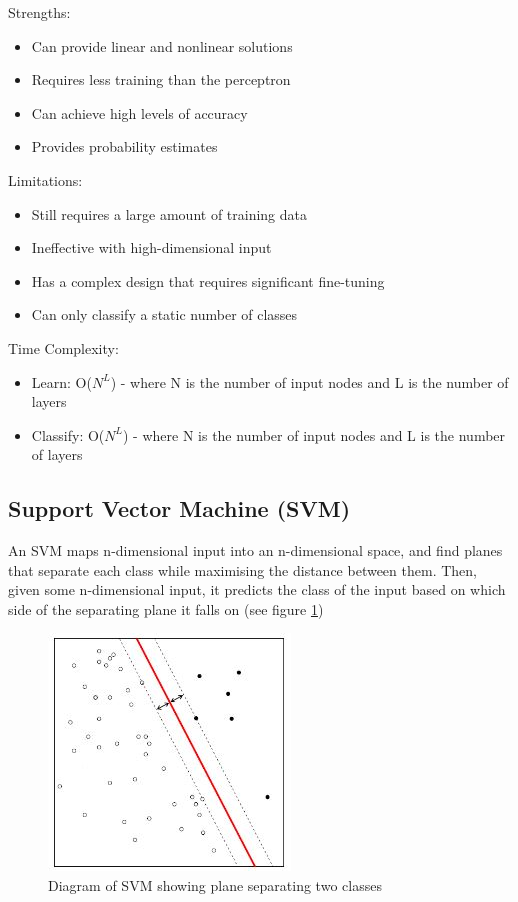 Strengths:
\begin{itemize}
    \item Can provide linear and nonlinear solutions
    \item Requires less training than the perceptron
    \item Can achieve high levels of accuracy
    \item Provides probability estimates
\end{itemize}

Limitations:
\begin{itemize}
    \item Still requires a large amount of training data
    \item Ineffective with high-dimensional input
    \item Has a complex design that requires significant fine-tuning
    \item Can only classify a static number of classes
\end{itemize}

Time Complexity:
\begin{itemize}
    \item Learn: O($N^{L}$) - where N is the number of input nodes and L is the number of layers
    \item Classify: O($N^{L}$) - where N is the number of input nodes and L is the number of layers
\end{itemize}

\subsection{Support Vector Machine (SVM)}
An SVM maps n-dimensional input into an n-dimensional space, and find planes that separate each class while maximising the distance between them. Then, given some n-dimensional input, it predicts the class of the input based on which side of the separating plane it falls on \citep{svm} (see figure \ref{fig:svm_img}) 

\begin{figure}[H]
    \centering
    \includegraphics{figs/8/linear_svm}
    \caption{Diagram of SVM showing plane separating two classes}
    \label{fig:svm_img}
\end{figure}

